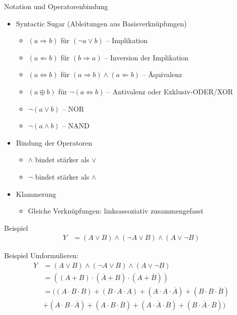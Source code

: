 \documentclass[12pt%
,aspectratio=169%
]{beamer}
\begin{document}
\begin{frame}{Notation und Operatorenbindung}
\begin{itemize}
	\item Syntactic Sugar (Ableitungen aus Basisverknüpfungen)
	\begin{itemize}
		\item $(a \Rightarrow b)$ für $(\neg a \lor b)$ -- Implikation
		\item $(a \Leftarrow b)$ für $(b \Rightarrow a)$ -- Inversion der Implikation
		\item $(a \Leftrightarrow b)$ für $(a \Rightarrow b) \land (a \Leftarrow b)$ -- Äquivalenz
		\item $(a \oplus b)$ für $\neg (a \Leftrightarrow b)$ -- Antivalenz oder Exklusiv-ODER/XOR
		\item $\neg(a \lor b)$ -- NOR
		\item $\neg (a \land b)$ -- NAND
	\end{itemize}
	\item Bindung der Operatoren 
	\begin{itemize}
		\item $\land$ bindet stärker als $\lor$
		\item $\neg$ bindet stärker als $\land$
	\end{itemize}
	\item Klammerung
	\begin{itemize}
		\item Gleiche Verknüpfungen: linksassoziativ zusammengefasst
	\end{itemize}
\end{itemize}	 
\end{frame}

\begin{frame}{Beispiel}
\begin{align*}
Y &= (A \lor B) \land (\neg A \lor B) \land (A \lor \neg B)
\end{align*}
\end{frame}

\begin{frame}{Beispiel}
Umformulieren:
\begin{align*}
Y &= (A \lor B) \land (\neg A \lor B) \land (A \lor \neg B)\\
&= \left(\left(A + B\right) \cdot \left(\overline{A} + B\right) \cdot \left(A + \overline{B}\right)\right)\\
&= \big( (A \cdot B \cdot B) + (B \cdot A \cdot A) + (A \cdot A \cdot \overline{A}) + (B \cdot B \cdot \overline{B}) \\
&+ (A \cdot B \cdot \overline{A}) + (A \cdot B \cdot \overline{B}) + (A \cdot \overline{A} \cdot \overline{B}) + (B \cdot \overline{A} \cdot \overline{B})\big)
\end{align*}
\end{frame}
\end{document}
